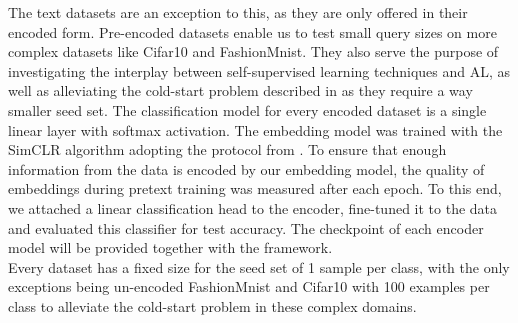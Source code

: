 \documentclass[]{article}
\begin{document}
The text datasets are an exception to this, as they are only offered in their encoded form.
Pre-encoded datasets enable us to test small query sizes on more complex datasets like Cifar10 and FashionMnist.
They also serve the purpose of investigating the interplay between self-supervised learning techniques and AL, as well as alleviating the cold-start problem described in \cite{luth2024navigating} as they require a way smaller seed set.
The classification model for every encoded dataset is a single linear layer with softmax activation.
The embedding model was trained with the SimCLR \cite{chen2020simple} algorithm adopting the protocol from \cite{hacohen2022active}. 
To ensure that enough information from the data is encoded by our embedding model, the quality of embeddings during pretext training was measured after each epoch.
To this end, we attached a linear classification head to the encoder, fine-tuned it to the data and evaluated this classifier for test accuracy. 
The checkpoint of each encoder model will be provided together with the framework. \\ [1mm]
Every dataset has a fixed size for the seed set of 1 sample per class, with the only exceptions being un-encoded FashionMnist and Cifar10 with 100 examples per class to alleviate the cold-start problem in these complex domains. 
\end{document}
